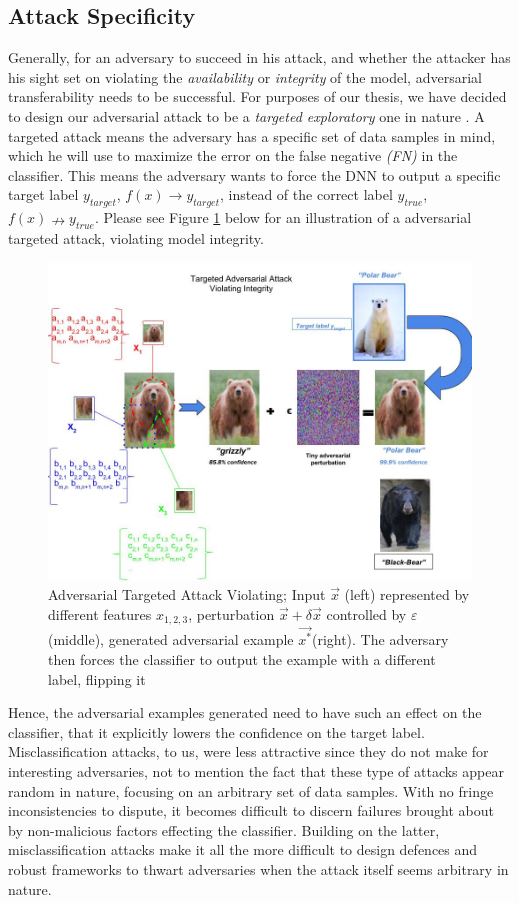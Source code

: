 \documentclass[grad,lot,lof,11pt,oneside,onehalfspace]{RUthesis}
\begin{document}
\subsection{Attack Specificity}
Generally, for an adversary to succeed in his attack, and whether the attacker has his sight set on violating the \textit{availability} or \textit{integrity} of the model, adversarial transferability  needs  to  be  successful.  For purposes  of  our  thesis,  we  have  decided  to design  our adversarial attack to be a \textit{targeted exploratory} one in nature \cite{huang_adversarial_2011}.  A targeted attack means the adversary has a specific set of data samples in mind, which he will use to maximize the error on the false negative \textit{(FN)} in the classifier.  This means the adversary wants to force the DNN to output a specific target label \textit{$y_{target}$}, \textit{$f(x)\longrightarrow y_{target}$}, instead of the correct label \textit{$y_{true}$}, \textit{$f(x) \nrightarrow y_{true}$}. Please see Figure \ref{fig:TargtedAttack} below for an illustration of a adversarial targeted attack, violating model integrity.
\begin{figure}[h]
\centering
\includegraphics[width=0.6\linewidth]{"Images/Chapter 4/TargtedAttack"}
\caption{Adversarial Targeted Attack Violating; Input $\vec{x}$ (left) represented by different features $x_{1,2,3}$, perturbation \textit{$\vec{x} + \delta\vec{x}$} controlled by $\varepsilon$ (middle), generated adversarial example $\vec{x^{*}}$(right). The adversary then forces the classifier to output the example with a different label, flipping it}
\label{fig:TargtedAttack}
\end{figure}
Hence, the adversarial examples generated need to have such an effect on the classifier, that it explicitly lowers the confidence on the target label.
Misclassification attacks, to us, were less attractive since they do not make for interesting adversaries, not to mention the fact that these type of attacks appear random in nature, focusing on an arbitrary set of data samples.  With no fringe inconsistencies to dispute,  it becomes difficult to discern failures brought about by non-malicious factors effecting the classifier.  Building on the latter, misclassification attacks make it all the more difficult to design defences and robust frameworks to thwart adversaries when the attack itself
seems arbitrary in nature.
\end{document}
